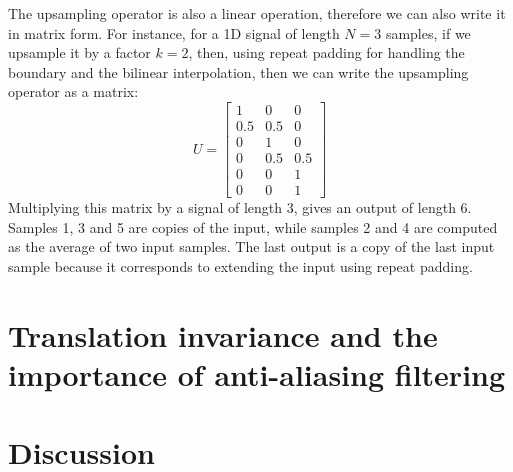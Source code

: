 The upsampling operator is also a linear operation, therefore we can also write it in matrix form. For instance, for a 1D signal of length $N=3$  samples, if we upsample it by a factor $k=2$, then, using repeat padding for handling the boundary and the bilinear interpolation, then we can write the upsampling operator as a matrix:
\begin{equation}
  U = \left[
    \begin{array}{ccc}
      1   & 0   & 0   \\
      0.5 & 0.5 & 0   \\
      0   & 1   & 0   \\
      0   & 0.5 & 0.5 \\
      0   & 0   & 1   \\
      0   & 0   & 1
    \end{array}
    \right]
\end{equation}
Multiplying this matrix by a signal of length 3, gives an output of length 6. Samples 1, 3 and 5 are copies of the input, while samples 2 and 4 are computed as the average of two input samples. The last output is a copy of the last input sample because it corresponds to extending the input using repeat padding.


\section{Translation invariance and the importance of anti-aliasing filtering}


\section{Discussion}


